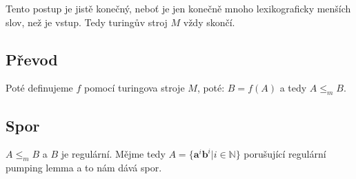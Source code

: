 \documentclass[a4paper,12pt]{article} %
\begin{document}
Tento postup je jistě konečný, neboť je jen konečně mnoho lexikograficky menších slov, než je vstup. Tedy turingův stroj $M$ vždy skončí.

\subsection*{Převod}

Poté definujeme $f$ pomocí turingova stroje $M$, poté: $B = f(A)$ a tedy $A \leq_m B$.

\subsection*{Spor}

$A \leq_m B$ a $B$ je regulární. Mějme tedy $A = \{\mathbf{a}^i\mathbf{b}^i | i \in \mathbb{N}\}$ porušující regulární pumping lemma a to nám dává spor.
\end{document}
